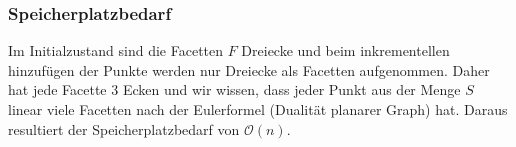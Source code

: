 \documentclass[a4paper]{article}
\begin{document}
\subsubsection*{Speicherplatzbedarf}

Im Initialzustand sind die Facetten $F$ Dreiecke und beim inkrementellen hinzufügen der Punkte werden nur Dreiecke als Facetten aufgenommen. Daher hat jede Facette 3 Ecken und wir wissen, dass jeder Punkt aus der Menge $S$ linear viele Facetten nach der Eulerformel (Dualität planarer Graph) hat. Daraus resultiert der Speicherplatzbedarf von $\mathcal{O}(n)$.
\end{document}
